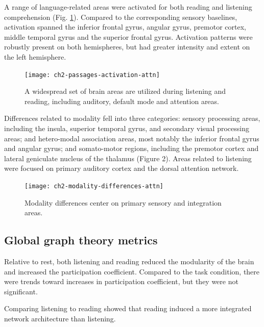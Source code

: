 A range of language-related areas were activated for both reading and listening comprehension (Fig. \ref{fig:ch2-passages-activation-attn}). Compared to the corresponding sensory baselines, activation spanned the inferior frontal gyrus, angular gyrus, premotor cortex, middle temporal gyrus and the superior frontal gyrus. Activation patterns were robustly present on both hemispheres, but had greater intensity and extent on the left hemisphere. 

\begin{figure}[tp]
	\centering
	\texttt{[image: ch2-passages-activation-attn]}
    \caption[There is significant overlap between the areas used in listening and reading.]{A widespread set of brain areas are utilized during listening and reading, including auditory, default mode and attention areas.}
	\label{fig:ch2-passages-activation-attn}
\end{figure}

Differences related to modality fell into three categories: sensory processing areas, including the insula, superior temporal gyrus, and secondary visual processing areas; and hetero-modal association areas, most notably the inferior frontal gyrus and angular gyrus; and somato-motor regions, including the premotor cortex and lateral geniculate nucleus of the thalamus (Figure 2). Areas related to listening were focused on primary auditory cortex and the dorsal attention network. 

\begin{figure}[!b]
	\centering
	\texttt{[image: ch2-modality-differences-attn]}
    \caption[Modality differences center on primary sensory and integration areas.]{Modality differences center on primary sensory and integration areas.}
	\label{fig:ch2-modality-differences-attn}
\end{figure}



\subsection{Global graph theory metrics}

Relative to rest, both listening and reading reduced the modularity of the brain and increased the participation coefficient. Compared to the task condition, there were trends toward increases in participation coefficient, but they were not significant. 

Comparing listening to reading showed that reading induced a more integrated network architecture than listening. 

